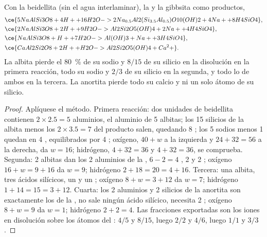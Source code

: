 \begin{proposition}\label{prop:b1:weathering-clays:feldspars}
Con la  beidellita 
(sin el agua interlaminar), la   y la gibbsita
 como productos,
\begin{align*}
&\ce{5 NaAlSi3O8 + 4 H+ + 16 H2O -> 2 Na_{0.5}Al2(Si_{3.5}Al_{0.5})O10(OH)2 + 4 Na+ + 8 H4SiO4},\\ %
&\ce{2 NaAlSi3O8 + 2 H+ + 9 H2O -> Al2Si2O5(OH)4 + 2 Na+ + 4 H4SiO4},\\
&\ce{NaAlSi3O8 + H+ + 7 H2O -> Al(OH)3 + Na+ + 3 H4SiO4},\\
&\ce{CaAl2Si2O8 + 2 H+ + H2O -> Al2Si2O5(OH)4 + Ca^2+}.
\end{align*}
La albita pierde el \qty{80}{\percent} de su sodio y $8/15$ de su silicio en la disolución en la primera reacción, todo su sodio y $2/3$ de su
silicio en la segunda, y todo lo de ambos en la tercera. La anortita pierde todo su calcio y ni un solo átomo de su silicio.
\end{proposition}

\begin{proof}
Aplíquese el método. Primera reacción: dos unidades de beidellita contienen $2\times2.5 = 5$ aluminios, el aluminio de 5 albitas; los 15
silicios de la albita menos los $2\times3.5 = 7$ del producto salen, quedando 8 ; los 5 sodios menos 1 quedan en 4 , equilibrados por
4 ; oxígeno, $40 + w$ a la izquierda y $24 + 32 =
56$ a la derecha, da $w = 16$; hidrógeno, $4 + 32 = 36$ y $4 + 32 = 36$, se comprueba. Segunda: 2 albitas dan los 2 aluminios de la , $6 - 2 = 4$
, 2  y 2 ; oxígeno $16 + w = 9 + 16$ da $w = 9$; hidrógeno $2 + 18 = 20 = 4 + 16$. Tercera: una albita, tres ácidos silícicos, un
 y un ; oxígeno $8 + w = 3 + 12$ da $w = 7$; hidrógeno $1 + 14 = 15 = 3 + 12$. Cuarta: los 2 aluminios y 2 silicios de la anortita son
exactamente los de la , no sale ningún ácido silícico,  necesita 2 ; oxígeno $8 + w = 9$ da $w = 1$; hidrógeno $2 + 2 = 4$. Las
fracciones exportadas son los iones en disolución sobre los átomos del : $4/5$ y $8/15$, luego $2/2$ y $4/6$, luego $1/1$ y $3/3$.
\end{proof}

